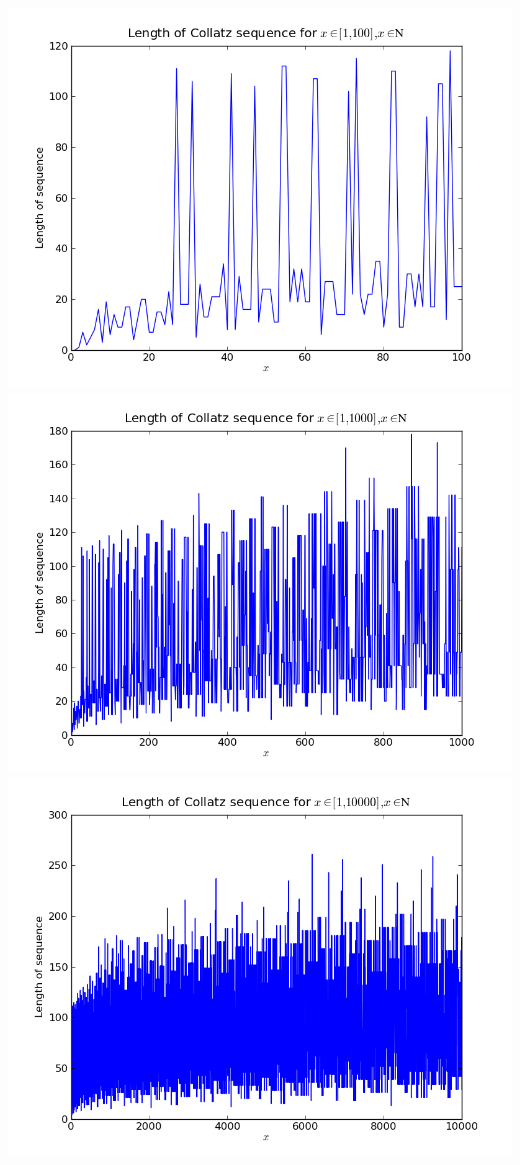 \documentclass{article}
\begin{document}
\section{}
\includegraphics[scale=0.5]{col100.png}
\includegraphics[scale=0.5]{col1000.png}
\includegraphics[scale=0.5]{col10000.png}
\end{document}
